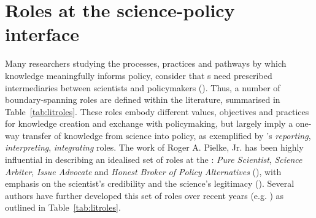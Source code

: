 


\section{Roles at the science-policy interface}\label{sec:litroles}

Many researchers studying the processes, practices and pathways by which knowledge meaningfully informs policy, consider that \SPI s need prescribed intermediaries between scientists and policymakers (\cite{JagannathanEtAl2023}). Thus, a number of boundary-spanning roles are defined within the literature, summarised in Table~\ref{tab:litroles}. These roles embody different values, objectives and practices for knowledge creation and exchange with policymaking, but largely imply a one-way transfer of knowledge from science into policy, as exemplified by \textcite{SteelLLS2004}'s \emph{reporting}, \emph{interpreting}, \emph{integrating} roles. The work of Roger A. Pielke, Jr. has been highly influential in describing an idealised set of roles at the \SPI: \emph{Pure Scientist}, \emph{Science Arbiter}, \emph{Issue Advocate} and \emph{Honest Broker of Policy Alternatives} (\cite{Pielke2007}), with emphasis on the scientist's credibility and the science's legitimacy (\cite{DuncanRE2020}). Several authors have further developed this set of roles over recent years (e.g. \cite{RapleyD2014,DuncanRE2020,GluckmanBK2021,GregoryBW2024}) as outlined in Table~\ref{tab:litroles}. %

